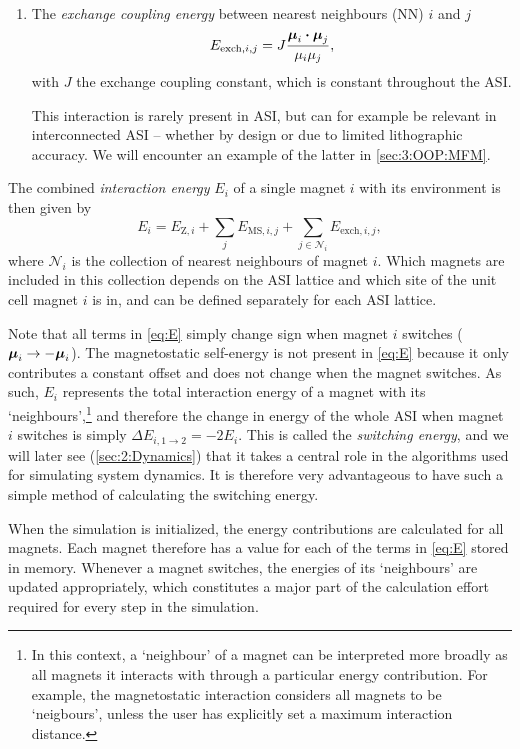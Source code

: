 \begin{enumerate}
	\item The \textit{exchange coupling energy} between nearest neighbours (NN) $i$ and $j$
	\begin{equation}
		E_{\mathrm{exch},i,j} = J \frac{\boldsymbol{\mathbf{\mu}}_i \boldsymbol{\cdot} \boldsymbol{\mathbf{\mu}}_j}{\mu_i \mu_j} \mathrm{,} \label{eq:Eexch}
	\end{equation}
	with $J$ the exchange coupling constant, which is constant throughout the ASI. \par
	This interaction is rarely present in ASI, but can for example be relevant in interconnected ASI -- whether by design or due to limited lithographic accuracy.
	We will encounter an example of the latter in \cref{sec:3:OOP:MFM}.
\end{enumerate}

The combined \textit{interaction energy} $E_i$ of a single magnet $i$ with its environment is then given by
\begin{equation}
	E_i = E_{\mathrm{Z},i} + \sum_j E_{\mathrm{MS},i,j} + \sum_{j \in \mathcal{N}_i} E_{\mathrm{exch},i,j} \mathrm{,}
	\label{eq:E}
\end{equation}
where $\mathcal{N}_i$ is the collection of nearest neighbours of magnet $i$.
Which magnets are included in this collection depends on the ASI lattice and which site of the unit cell magnet $i$ is in, and can be defined separately for each ASI lattice. \\\par
Note that all terms in \cref{eq:E} simply change sign when magnet $i$ switches ($\boldsymbol{\mathbf{\mu}}_i \rightarrow -\boldsymbol{\mathbf{\mu}}_i$).
The magnetostatic self-energy is not present in \cref{eq:E} because it only contributes a constant offset and does not change when the magnet switches.
As such, $E_i$ represents the total interaction energy of a magnet with its `neighbours',\footnote{
	In this context, a `neighbour' of a magnet can be interpreted more broadly as all magnets it interacts with through a particular energy contribution. For example, the magnetostatic interaction considers all magnets to be `neigbours', unless the user has explicitly set a maximum interaction distance.
} and therefore the change in energy of the whole ASI when magnet $i$ switches is simply $\Delta E_{i,1\rightarrow2} = -2 E_i$.
This is called the \textit{switching energy}, and we will later see (\cref{sec:2:Dynamics}) that it takes a central role in the algorithms used for simulating system dynamics.
It is therefore very advantageous to have such a simple method of calculating the switching energy. \par
When the simulation is initialized, the energy contributions are calculated for all magnets.
Each magnet therefore has a value for each of the terms in \cref{eq:E} stored in memory.
Whenever a magnet switches, the energies of its `neighbours' are updated appropriately, which constitutes a major part of the calculation effort required for every step in the simulation.


